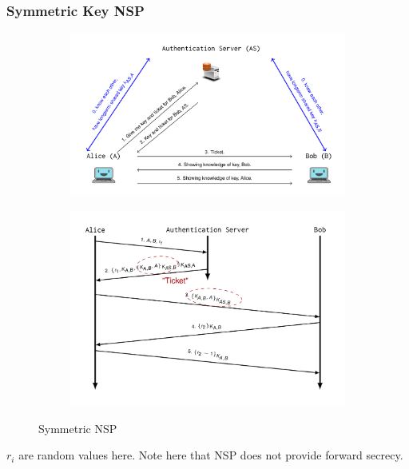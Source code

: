 \subsubsection{Symmetric Key NSP}
\begin{figure}[H]
\centering
\begin{subfigure}{.5\textwidth}
  \centering
  \includegraphics[width=\textwidth]{figures/symmetric_nsp_1.png}
\end{subfigure}%
\begin{subfigure}{.5\textwidth}
  \centering
  \includegraphics[width=\textwidth]{figures/symmetric_nsp_2.png}
\end{subfigure}
\caption{Symmetric NSP}\label{fig:symmetric_nsp}
\end{figure}
$r_i$ are random values here.
Note here that NSP does not provide forward secrecy.

